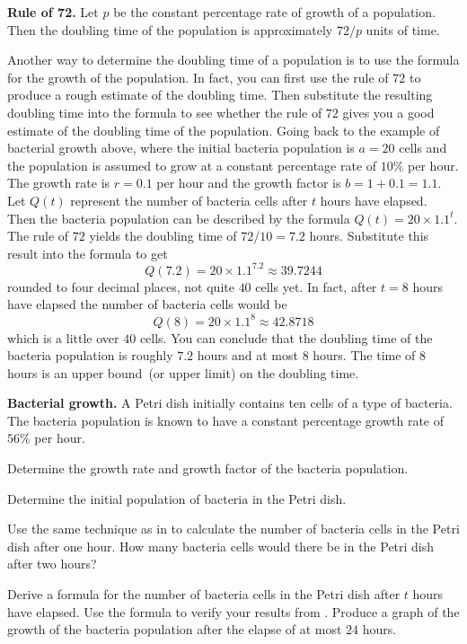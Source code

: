 \documentclass[a4paper,oneside,12pt]{article}
\begin{document}
\begin{theorem}
\textbf{Rule of 72.}
Let $p$ be the constant percentage rate of growth of a population.
Then the doubling time of the population is approximately $72 / p$
units of time.
\end{theorem}

Another way to determine the doubling time of a population is to use
the formula for the growth of the population.  In fact, you can first
use the rule of $72$ to produce a rough estimate of the doubling
time.  Then substitute the resulting doubling time into the formula to
see whether the rule of $72$ gives you a good estimate of the doubling
time of the population.  Going back to the example of bacterial growth
above, where the initial bacteria population is $a = 20$ cells and the
population is assumed to grow at a constant percentage rate of $10\%$
per hour.  The growth rate is $r = 0.1$ per hour and the growth factor
is $b = 1 + 0.1 = 1.1$.  Let $Q(t)$ represent the number of bacteria
cells after $t$ hours have elapsed.  Then the bacteria population can
be described by the formula $Q(t) = 20 \times 1.1^t$.  The rule of
$72$ yields the doubling time of $72 / 10 = 7.2$ hours.  Substitute
this result into the formula to get
\[
Q(7.2)
=
20 \times 1.1^{7.2}
\approx
39.7244
\]
rounded to four decimal places, not quite $40$ cells yet.  In fact,
after $t = 8$ hours have elapsed the number of bacteria cells would be
\[
Q(8)
=
20 \times 1.1^8
\approx
42.8718
\]
which is a little over $40$ cells.  You can conclude that the doubling
time of the bacteria population is roughly $7.2$ hours and at most $8$
hours.  The time of $8$ hours is an upper bound~(or upper limit) on
the doubling time.

\begin{example}
\label{eg:bacterial_growth}
\textbf{Bacterial growth.}
A Petri dish initially contains ten cells of a type of bacteria.  The
bacteria population is known to have a constant percentage growth rate
of $56\%$ per hour.
\begin{packedenum}
\item\label{subeg:bacteria_growth_rate}
  Determine the growth rate and growth factor of the bacteria
  population.

\item\label{subeg:bacteria_initial_population}
  Determine the initial population of bacteria in the Petri dish.

\item\label{subeg:bacteria_growth_1_2_hours}
  Use the same technique as in
   to calculate
  the number of bacteria cells in the Petri dish after one hour.  How
  many bacteria cells would there be in the Petri dish after two
  hours?

\item\label{subeg:bacteria_growth_formula}
  Derive a formula for the number of bacteria cells in the Petri dish
  after $t$ hours have elapsed.  Use the formula to verify your
  results from .  Produce a
  graph of the growth of the bacteria population after the elapse of
  at most $24$ hours.
\end{packedenum}
\end{example}
\end{document}
